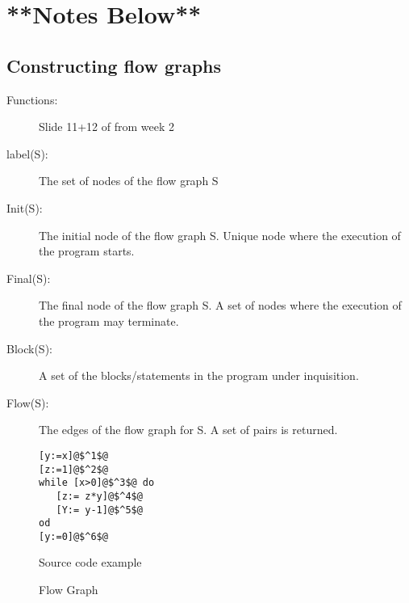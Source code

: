 \documentclass[12pt]{article}
\begin{document}
\section*{**Notes Below**}

\subsection*{Constructing flow graphs}

\begin{description}
   \item[Functions:] Slide 11+12 of from week 2
   \item[label(S):] The set of nodes of the flow graph S
   \item[Init(S):] The initial node of the flow graph S. Unique node where the execution of the program starts.
   \item[Final(S):] The final node of the flow graph S. A set of nodes where the execution of the program may terminate.
   \item[Block(S):] A set of the blocks/statements in the program under inquisition.
   \item[Flow(S):] The edges of the flow graph for S. A set of pairs is returned.
\end{description}

\begin{figure}
\begin{lstlisting}
[y:=x]@$^1$@
[z:=1]@$^2$@
while [x>0]@$^3$@ do
   [z:= z*y]@$^4$@
   [Y:= y-1]@$^5$@
od
[y:=0]@$^6$@
\end{lstlisting}
\label{source:example1}
\caption{Source code example}
\end{figure}

\begin{figure}


\caption{Flow Graph}

\end{figure}
\end{document}

